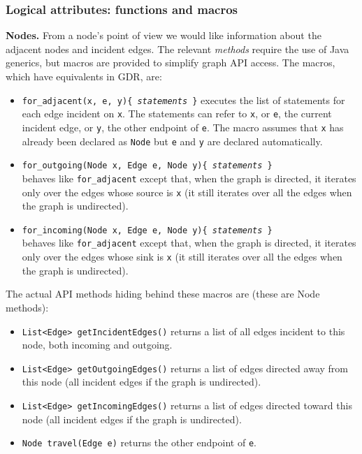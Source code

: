 \subsubsection{Logical attributes: functions and macros}

\textbf{Nodes.}
From a node's point of view we would like information about the adjacent nodes and incident edges.
The relevant \emph{methods} require the use of Java generics, but macros are provided
to simplify graph API access. The macros, which have equivalents in GDR, are:

\begin{itemize}

\item
\texttt{for\_adjacent(x, e, y)\{ \emph{statements} \}}
executes the list of statements for each edge incident on \verb$x$.
The statements can refer to \verb$x$, or \verb$e$, the current incident edge,
or \verb$y$, the other endpoint of \verb$e$.
The macro assumes that \texttt{x} has already been declared as \texttt{Node}
but \texttt{e} and \texttt{y} are declared automatically.

\item
\texttt{for\_outgoing(Node x, Edge e, Node y)\{ \emph{statements} \}}\\
behaves like \texttt{for\_adjacent} except that, when the graph is directed,
it iterates only over the edges whose source is \verb$x$ (it still iterates over all the edges when the graph is undirected). 

\item
\texttt{for\_incoming(Node x, Edge e, Node y)\{ \emph{statements} \}}\\
behaves like \texttt{for\_adjacent} except that, when the graph is directed,
it iterates only over the edges whose sink is \verb$x$ (it still iterates over all the edges when the graph is undirected). 

\end{itemize}

The actual API methods hiding behind these macros are (these are Node methods):

\begin{itemize}
\item
\texttt{List<Edge>~getIncidentEdges()} returns a list of all edges incident to this node,
both incoming and outgoing.
\item
\texttt{List<Edge>~getOutgoingEdges()} returns a list of edges directed away
from this node (all incident edges if the graph is undirected).
\item
\texttt{List<Edge>~getIncomingEdges()} returns a list of edges directed toward
this node (all incident edges if the graph is undirected).
\item
\texttt{Node~travel(Edge~e)} returns the other endpoint of \texttt{e}.
\end{itemize}

